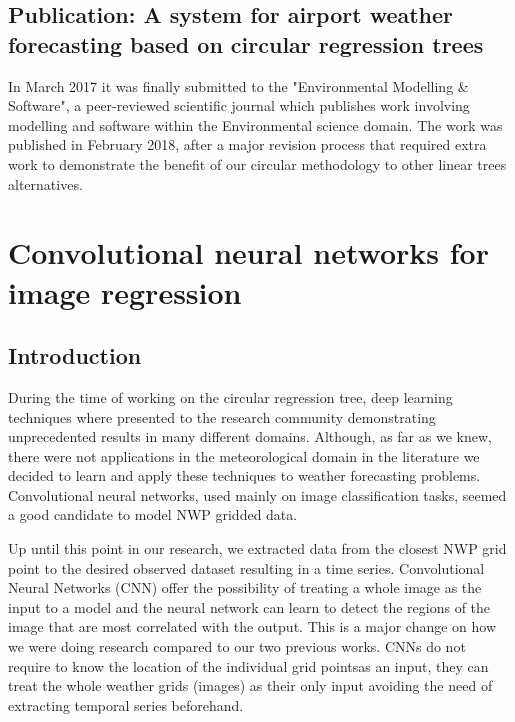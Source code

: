 \subsection{Publication: A system for airport weather forecasting based on circular regression trees}

In March 2017 it was finally submitted to the "Environmental Modelling \& Software", a peer-reviewed scientific journal which publishes work involving modelling and software within the Environmental science domain. The work was published in February 2018, after a major revision process that required extra work to demonstrate the benefit of our circular methodology to other linear trees alternatives.



\section{Convolutional neural networks for image regression}

\subsection{Introduction}
During the time of working on the circular regression tree, deep learning techniques where presented to the research community demonstrating unprecedented results in many different domains. Although, as far as we knew, there were not applications in the meteorological domain in the literature we decided to learn and apply these techniques to weather forecasting problems. Convolutional neural networks, used mainly on image classification tasks, seemed a good candidate to model NWP gridded data.

Up until this point in our research, we extracted data from the closest NWP grid point to the desired observed dataset resulting in a time series. Convolutional Neural Networks (CNN) offer the possibility of treating a whole image as the input to a model and the neural network can learn to detect the regions of the image that are most correlated with the output. This is a major change on how we were doing research compared to our two previous works. CNNs do not require to know the location of the individual grid pointsas an input, they can treat the whole weather grids (images) as their only input avoiding the need of extracting temporal series beforehand.

